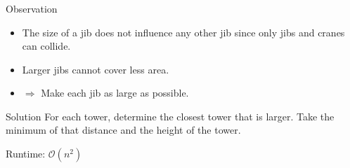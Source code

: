 \begin{frame}
	\frametitle{\problemtitle}
	\begin{block}{Observation}
		\begin{itemize}
			\item The size of a jib does not influence any other jib since only jibs and cranes can collide.
			\item Larger jibs cannot cover less area.
			\pause
			\item[] $\Longrightarrow$ Make each jib as large as possible.
		\end{itemize}
	\end{block}
	\bigskip
	\pause
	\begin{block}{Solution}
		For each tower, determine the closest tower that is larger. Take the minimum of that distance and the height of the tower.
		\pause

		Runtime: $\mathcal{O}(n^2)$
	\end{block}
	\pause
	\solvestats
\end{frame}
